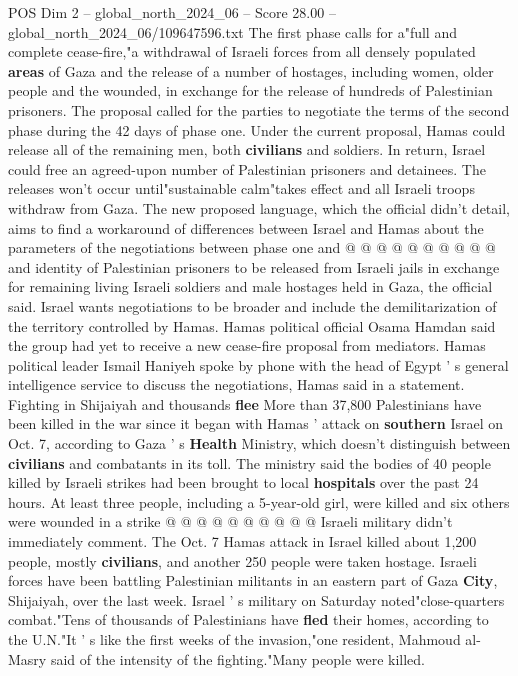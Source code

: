 \begin{textsample}{POS Dim 2 – global\_north\_2024\_06 – Score 28.00 – global\_north\_2024\_06/109647596.txt}
The first phase calls for a"full and complete cease-fire,"a withdrawal of Israeli forces from all densely populated \textbf{areas} of Gaza and the release of a number of hostages, including women, older people and the wounded, in exchange for the release of hundreds of Palestinian prisoners.
The proposal called for the parties to negotiate the terms of the second phase during the 42 days of phase one.
Under the current proposal, Hamas could release all of the remaining men, both \textbf{civilians} and soldiers.
In return, Israel could free an agreed-upon number of Palestinian prisoners and detainees.
The releases won't occur until"sustainable calm"takes effect and all Israeli troops withdraw from Gaza.
The new proposed language, which the official didn't detail, aims to find a workaround of differences between Israel and Hamas about the parameters of the negotiations between phase one and @ @ @ @ @ @ @ @ @ @ and identity of Palestinian prisoners to be released from Israeli jails in exchange for remaining living Israeli soldiers and male hostages held in Gaza, the official said.
Israel wants negotiations to be broader and include the demilitarization of the territory controlled by Hamas.
Hamas political official Osama Hamdan said the group had yet to receive a new cease-fire proposal from mediators.
Hamas political leader Ismail Haniyeh spoke by phone with the head of Egypt ' s general intelligence service to discuss the negotiations, Hamas said in a statement.
Fighting in Shijaiyah and thousands \textbf{flee} More than 37,800 Palestinians have been killed in the war since it began with Hamas ' attack on \textbf{southern} Israel on Oct. 7, according to Gaza ' s \textbf{Health} Ministry, which doesn't distinguish between \textbf{civilians} and combatants in its toll.
The ministry said the bodies of 40 people killed by Israeli strikes had been brought to local \textbf{hospitals} over the past 24 hours.
At least three people, including a 5-year-old girl, were killed and six others were wounded in a strike @ @ @ @ @ @ @ @ @ @ Israeli military didn't immediately comment.
The Oct. 7 Hamas attack in Israel killed about 1,200 people, mostly \textbf{civilians}, and another 250 people were taken hostage.
Israeli forces have been battling Palestinian militants in an eastern part of Gaza \textbf{City}, Shijaiyah, over the last week.
Israel ' s military on Saturday noted"close-quarters combat."Tens of thousands of Palestinians have \textbf{fled} their homes, according to the U.N."It ' s like the first weeks of the invasion,"one resident, Mahmoud al-Masry said of the intensity of the fighting."Many people were killed.

\end{textsample}
